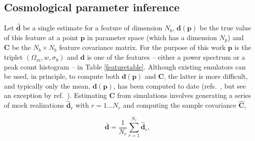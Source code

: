 \documentclass[reprint,aps,prd,superscriptaddress,showkeys,showpacs]{revtex4-1}
\newcommand{\bb}[1]{\mathbf{#1}}
\newcommand{\bbh}[1]{\mathbf{\hat{#1}}}
\begin{document}
\subsection{Cosmological parameter inference}
%
Let $\bbh{d}$ be a single estimate for a feature of dimension $N_b$,
$\bb{d}(\bb{p})$ be the true value of this feature at a point $\bb{p}$
in parameter space (which has a dimension $N_p$) and $\bb{C}$ be the
$N_b\times N_b$ feature covariance matrix. For the purpose of this
work $\bb{p}$ is the triplet $(\Omega_m,w,\sigma_8)$ and $\bb{d}$ is
one of the features -- either a power spectrum or a peak count
histogram -- in Table \ref{featuretable}. Although existing emulators
can be used, in principle, to compute both $\bb{d}(\bb{p})$ and
$\bb{C}$, the latter is more difficult, and typically only the mean,
$\bb{d}(\bb{p})$, has been computed to date (refs.~\citep{coyote2,Nicaea}, but see
an exception by ref.~\citep{SchneiderKnoxCovariance}).
Estimating $\bb{C}$ from simulations involves generating a series of
mock realizations $\bbh{d}_r$ with $r=1...N_r$ and computing the
sample covariance $\bbh{C}$,

\begin{equation}
\bb{\bar{d}} = \frac{1}{N_r}\sum_{r=1}^{N_r} \bbh{d}_r,
\end{equation}
\end{document}
